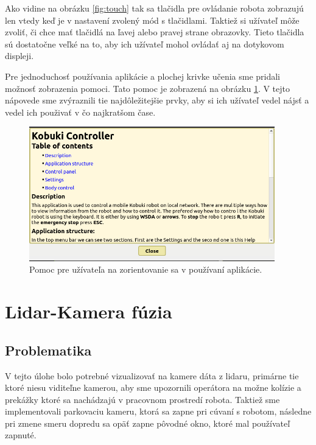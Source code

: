 Ako vidine na obrázku \ref{fig:touch} tak sa tlačidla pre ovládanie robota zobrazujú len vtedy keď je v nastavení
zvolený mód s tlačidlami. Taktiež si užívateľ môže zvoliť, či chce mať tlačidlá na ľavej alebo pravej strane obrazovky.
Tieto tlačidla sú dostatočne veľké na to, aby ich užívateľ mohol ovládať aj na dotykovom displeji.

Pre jednoduchosť používania aplikácie a plochej krivke učenia sme pridali možnosť zobrazenia pomoci.
Tato pomoc je zobrazená na obrázku \ref{fig:help}. V tejto nápovede sme zvýraznili tie najdôležitejšie prvky,
aby si ich užívateľ vedel nájsť a vedel ich použivať v čo najkratšom čase.

\begin{figure}[!htbp]
	\begin{center}
		\includegraphics[width=0.95\textwidth]{img/help.png}
	\end{center}
	\caption{Pomoc pre užívateľa na zorientovanie sa v používaní aplikácie.}
	\label{fig:help}
\end{figure}

\section{Lidar-Kamera fúzia}

\subsection{Problematika}
V tejto úlohe bolo potrebné vizualizovať na kamere dáta z lidaru, primárne tie ktoré niesu viditeľne kamerou, aby sme upozornili
operátora na možne kolízie a prekážky ktoré sa nachádzajú v pracovnom prostredí robota. Taktiež sme implementovali parkovaciu
kameru, ktorá sa zapne pri cúvaní s robotom, následne pri zmene smeru dopredu sa opäť zapne pôvodné okno, ktoré mal používateľ
zapnuté.

